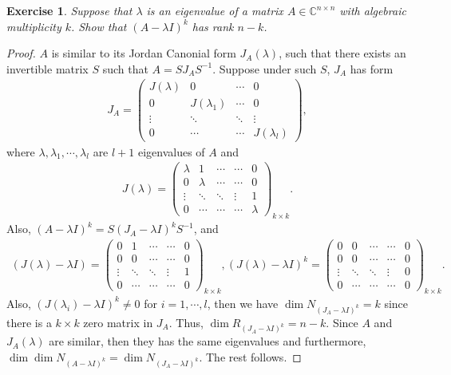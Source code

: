 \documentclass[11pt]{article}
\newtheorem{exercise}{Exercise}[section]
\theoremstyle{definition}
\numberwithin{equation}{subsection}
\begin{document}
\begin{exercise}
Suppose that $\lambda$ is an eigenvalue of a matrix $A \in \mathbb{C}^{n \times n}$ with algebraic multiplicity $k$. Show that $(A - \lambda I)^k$ has rank $n - k$.
\end{exercise}
\begin{proof}
$A$ is similar to its Jordan Canonial form $J_A(\lambda)$, such that there exists an invertible matrix $S$ such that $A = S J_A S^{-1}$. Suppose under such $S$, $J_A$ has form
\begin{align*}
    J_A = \begin{pmatrix}
        J(\lambda) & 0 & \cdots & 0 \\
        0 & J(\lambda_1) & \cdots & 0 \\
        \vdots & \ddots & \ddots & \vdots \\
        0 & \cdots & \cdots & J(\lambda_l)
    \end{pmatrix},
\end{align*}
where $\lambda, \lambda_1, \cdots, \lambda_l$ are $l+1$ eigenvalues of $A$ and
\begin{align*}
    J(\lambda) = \begin{pmatrix}
        \lambda & 1 & \cdots & \cdots & 0 \\
        0 & \lambda & \cdots & \cdots &  0 \\
        \vdots & \ddots & \ddots & \vdots & 1 \\
        0 & \cdots & \cdots & \cdots & \lambda
    \end{pmatrix}_{k \times k}.
\end{align*}
Also, $(A - \lambda I)^k = S (J_A - \lambda I)^k S^{-1}$, and 
\begin{align*}
    (J(\lambda) - \lambda I) = \begin{pmatrix}
        0 & 1 & \cdots & \cdots & 0 \\
        0 & 0 & \cdots & \cdots &  0 \\
        \vdots & \ddots & \ddots & \vdots & 1 \\
        0 & \cdots & \cdots & \cdots & 0
    \end{pmatrix}_{k \times k}, (J(\lambda) - \lambda I)^k = \begin{pmatrix}
        0 & 0 & \cdots & \cdots & 0 \\
        0 & 0 & \cdots & \cdots &  0 \\
        \vdots & \ddots & \ddots & \vdots & 0 \\
        0 & \cdots & \cdots & \cdots & 0
    \end{pmatrix}_{k \times k}.
\end{align*}
Also, $(J(\lambda_i) - \lambda I)^k \neq 0$ for $i = 1, \cdots, l$, then we have $\dim N_{(J_A - \lambda I)^k} = k$ since there is a $k\times k$ zero matrix in $J_A$. Thus, $\dim R_{(J_A - \lambda I)^k} = n - k$. Since $A$ and $J_A(\lambda)$ are similar, then they has the same eigenvalues and furthermore, $\dim \dim N_{(A - \lambda I)^k} = \dim N_{(J_A - \lambda I)^k}$. The rest follows.
\end{proof}
\end{document}
